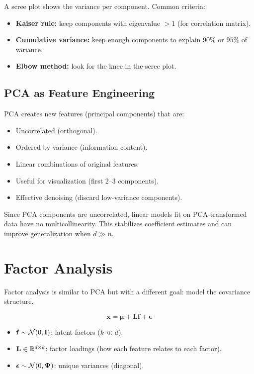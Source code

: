 A scree plot shows the variance per component. Common criteria:

\begin{itemize}
	\item \textbf{Kaiser rule:} keep components with eigenvalue $> 1$ (for correlation matrix).
	\item \textbf{Cumulative variance:} keep enough components to explain $90\%$ or $95\%$ of variance.
	\item \textbf{Elbow method:} look for the knee in the scree plot.
\end{itemize}

\subsection{PCA as Feature Engineering}

PCA creates new features (principal components) that are:
\begin{itemize}
	\item Uncorrelated (orthogonal).
	\item Ordered by variance (information content).
	\item Linear combinations of original features.
	\item Useful for visualization (first 2--3 components).
	\item Effective denoising (discard low-variance components).
\end{itemize}

\begin{principle}
	Since PCA components are uncorrelated, linear models fit on PCA-transformed data have no multicollinearity. This stabilizes coefficient estimates and can improve generalization when $d \gg n$.
\end{principle}

\section{Factor Analysis}

Factor analysis is similar to PCA but with a different goal: model the covariance structure.

\[
	\mathbf{x} = \boldsymbol{\mu} + \mathbf{L} \mathbf{f} + \boldsymbol{\epsilon}
\]

\begin{itemize}
	\item $\mathbf{f} \sim \mathcal{N}(0, \mathbf{I})$: latent factors ($k \ll d$).
	\item $\mathbf{L} \in \mathbb{R}^{d \times k}$: factor loadings (how each feature relates to each factor).
	\item $\boldsymbol{\epsilon} \sim \mathcal{N}(0, \boldsymbol{\Psi})$: unique variances (diagonal).
\end{itemize}

